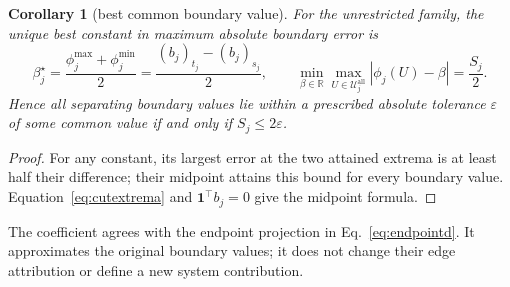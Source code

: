\documentclass[a4paper,fleqn]{cas-sc}
\newtheorem{corollary}[theorem]{Corollary}
\begin{document}
\begin{corollary}[best common boundary value]\label{cor:approxinterchange}
For the unrestricted family, the unique best constant in maximum absolute
boundary error is
\[
\beta_j^\star=\frac{\phi_j^{\max}+\phi_j^{\min}}2
=\frac{(b_j)_{t_j}-(b_j)_{s_j}}2,\qquad
\min_{\beta\in\mathbb R}\max_{U\in\mathcal U_j^{\mathrm{all}}}
|\phi_j(U)-\beta|=\frac{S_j}{2}.
\]
Hence all separating boundary values lie within a prescribed absolute tolerance
$\varepsilon$ of some common value if and only if $S_j\le2\varepsilon$.
\end{corollary}
\begin{proof}
For any constant, its largest error at the two attained extrema is at least
half their difference; their midpoint attains this bound for every boundary value.
Equation~\eqref{eq:cutextrema} and $\mathbf1^\top b_j=0$ give the midpoint formula.
\end{proof}
The coefficient agrees with the endpoint projection in
Eq.~\eqref{eq:endpointd}. It approximates the original boundary values; it does
not change their edge attribution or define a new system contribution.
\end{document}
